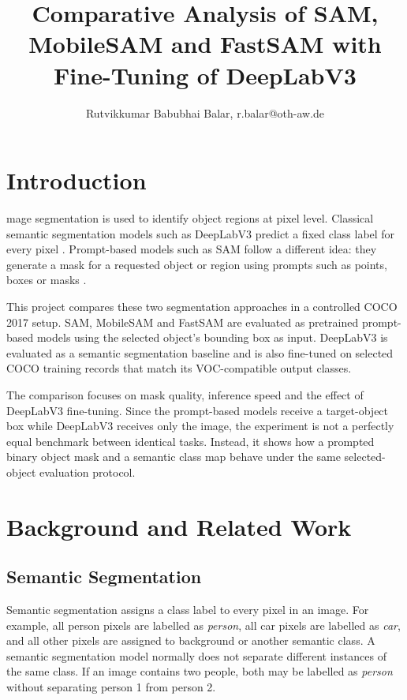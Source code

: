 \documentclass[9pt,a4paper,oneside]{rho-class/rho}
\title{Comparative Analysis of SAM, MobileSAM and FastSAM with Fine-Tuning of DeepLabV3}
\author[1,\textdagger]{Rutvikkumar Babubhai Balar, r.balar@oth-aw.de}
\affil[1]{OTH Amberg-Weiden, Study programme ``Master of Artificial Intelligence for Industrial Applications''}
\begin{document}
    \onecolumn

    \maketitle
    \thispagestyle{firststyle}



\section{Introduction}

    mage segmentation is used to identify object regions at pixel level. Classical semantic segmentation models such as DeepLabV3 predict a fixed class label for every pixel \cite{chen2017deeplabv3}. Prompt-based models such as SAM follow a different idea: they generate a mask for a requested object or region using prompts such as points, boxes or masks \cite{kirillov2023sam}.

    This project compares these two segmentation approaches in a controlled COCO 2017 setup. SAM, MobileSAM and FastSAM are evaluated as pretrained prompt-based models using the selected object's bounding box as input. DeepLabV3 is evaluated as a semantic segmentation baseline and is also fine-tuned on selected COCO training records that match its VOC-compatible output classes.

    The comparison focuses on mask quality, inference speed and the effect of DeepLabV3 fine-tuning. Since the prompt-based models receive a target-object box while DeepLabV3 receives only the image, the experiment is not a perfectly equal benchmark between identical tasks. Instead, it shows how a prompted binary object mask and a semantic class map behave under the same selected-object evaluation protocol.

\section{Background and Related Work}

\subsection{Semantic Segmentation}

    Semantic segmentation assigns a class label to every pixel in an image. For example, all person pixels are labelled as \textit{person}, all car pixels are labelled as \textit{car}, and all other pixels are assigned to background or another semantic class. A semantic segmentation model normally does not separate different instances of the same class. If an image contains two people, both may be labelled as \textit{person} without separating person 1 from person 2.
\end{document}
